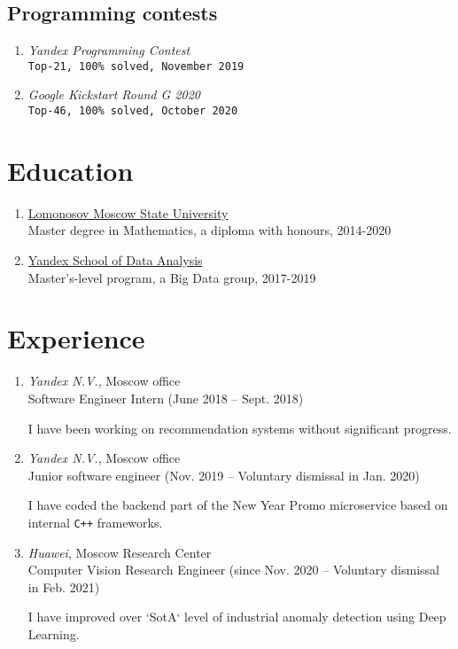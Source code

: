 \documentclass[twocolumn,10pt]{extarticle}
\begin{document}
\subsection{Programming contests}
\begin{enumerate}
  \item \textit{Yandex Programming Contest} \\
    \quad \texttt{Top-21, 100\% solved, November 2019}
  \item \textit{Google Kickstart Round G 2020} \\
    \quad \texttt{Top-46, 100\% solved, October 2020}
\end{enumerate}

\vfill

\section{Education}

\begin{enumerate}
  \item \href{https://www.msu.ru/en/}{Lomonosov Moscow State University} \\
    \quad Master degree in Mathematics, a diploma with honours, 2014-2020
  \item \href{https://yandexdataschool.com}{Yandex School of Data Analysis} \\
    \quad Master’s-level program, a Big Data group, 2017-2019
\end{enumerate}

\section{Experience}

\begin{enumerate}
  \item \textit{Yandex N.V.}, Moscow office \\
    \quad Software Engineer Intern (June 2018 -- Sept. 2018)

    \quad I have been working on recommendation systems without significant progress.
  \item \textit{Yandex N.V.}, Moscow office \\
    \quad Junior software engineer (Nov. 2019 -- Voluntary dismissal in Jan. 2020)

    \quad I have coded the backend part of the New Year Promo microservice based on internal \texttt{C++} frameworks.
  \item \textit{Huawei}, Moscow Research Center \\
    \quad Computer Vision Research Engineer (since Nov. 2020 -- Voluntary dismissal in Feb. 2021)

    \quad I have improved over `SotA` level of industrial anomaly detection using Deep Learning.
\end{enumerate}
\end{document}
